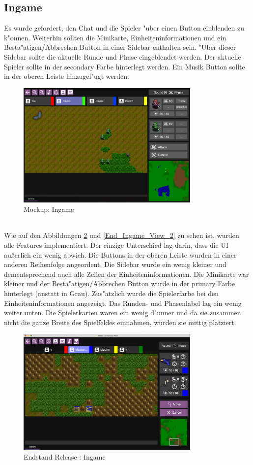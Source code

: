 \documentclass[12pt, titlepage]{scrartcl}
\newcommand{\RN}[1]{%
	\textup{\uppercase\expandafter{\romannumeral#1}}%
}
\begin{document}
		\subsection{Ingame}
			Es wurde gefordert, den Chat und die Spieler "uber einen Button einblenden zu k"onnen. Weiterhin sollten die Minikarte, Einheiteninformationen und ein Besta"atigen/Abbrechen Button in einer Sidebar enthalten sein. "Uber dieser Sidebar sollte die aktuelle Runde und Phase eingeblendet werden. Der aktuelle Spieler sollte in der secondary Farbe hinterlegt werden. Ein Musik Button sollte in der oberen Leiste hinzugef"ugt werden.
			\begin{figure}[H] 
				\centering
				\includegraphics[width=0.8\textwidth]{images/mockups/Ingame.png}
				\caption{Mockup: Ingame}
				\label{Ingame_View_2}
			\end{figure}
			\ \\ Wie auf den Abbildungen \ref{End_Ingame_View} und \ref{End_Ingame_View_2} zu sehen ist, wurden alle Features implementiert. Der einzige Unterschied lag darin, dass die UI au{\ss}erlich ein wenig abwich. Die Buttons in der oberen Leiste wurden in einer anderen Reihenfolge angeordent. Die Sidebar wurde ein wenig kleiner und dementsprechend auch alle Zellen der Einheiteninformationen. Die Minikarte war kleiner und der Besta"atigen/Abbrechen Button wurde in der primary Farbe hinterlegt (anstatt in Grau). Zus"atzlich wurde die Spielerfarbe bei den Einheiteninformationen angezeigt. Das Runden- und Phasenlabel lag ein wenig weiter unten. Die Spielerkarten waren ein wenig d"unner und da sie zusammen nicht die ganze Breite des Spielfeldes einnahmen, wurden sie mittig platziert.
			\begin{figure}[H] 
				\centering
				\includegraphics[width=0.8\textwidth]{images/endOfRelease/Ingame.png}
				\caption{Endstand Release \RN{3}: Ingame}
				\label{End_Ingame_View}
			\end{figure}
\end{document}
